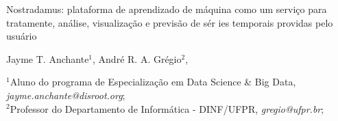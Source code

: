 \documentclass[portrait, 24pt, final]{sciposter}
\begin{document}


\vspace{10cm}

\noindent
\begin{minipage}[c][10cm][c]{0.75\textwidth}

  \vspace{6ex}
  {\Huge
	Nostradamus: plataforma de aprendizado de máquina como um serviço para tratamente, análise, visualização e previsão de sér    ies temporais providas pelo usuário}

  \vspace{1ex}
  {\Large
    Jayme T. Anchante$^1$,
    André R. A. Grégio$^2$,
  }

  \vspace{1ex}
  $^1${Aluno do programa de Especialização em Data Science \& Big Data, {\it jayme.anchante@disroot.org}};\\
  $^2${Professor do Departamento de Informática - DINF/UFPR, {\it gregio@ufpr.br}};\\

\end{minipage}

\vspace{3cm}

\end{document}
